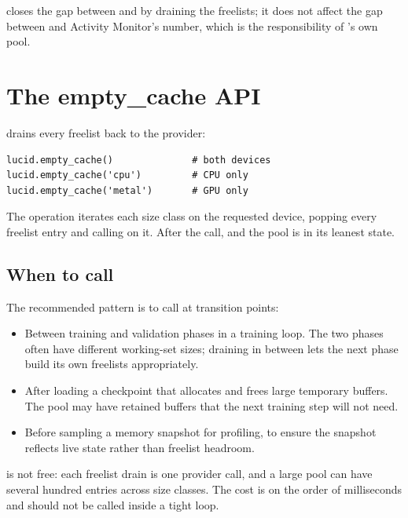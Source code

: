  closes the gap between
 and  by draining the freelists; it
does not affect the gap between  and Activity
Monitor's number, which is the responsibility of \MLX's own pool.

\section{The empty\_cache API}
\label{sec:allocator:empty_cache}

 drains every freelist back to the
provider:

\begin{lstlisting}[style=lucid,language=LucidPython]
lucid.empty_cache()              # both devices
lucid.empty_cache('cpu')         # CPU only
lucid.empty_cache('metal')       # GPU only
\end{lstlisting}

The operation iterates each size class on the requested device,
popping every freelist entry and calling  on
it. After the call,  and the pool is
in its leanest state.

\subsection{When to call}
\label{ssec:allocator:when_empty_cache}

The recommended pattern is to call  at
transition points:

\begin{itemize}
  \item Between training and validation phases in a training loop.
    The two phases often have different working-set sizes; draining
    in between lets the next phase build its own freelists
    appropriately.
  \item After loading a checkpoint that allocates and frees large
    temporary buffers. The pool may have retained buffers that the
    next training step will not need.
  \item Before sampling a memory snapshot for profiling, to ensure
    the snapshot reflects live state rather than freelist headroom.
\end{itemize}

 is not free: each freelist drain is one
provider call, and a large pool can have several hundred entries
across size classes. The cost is on the order of milliseconds and
should not be called inside a tight loop.

